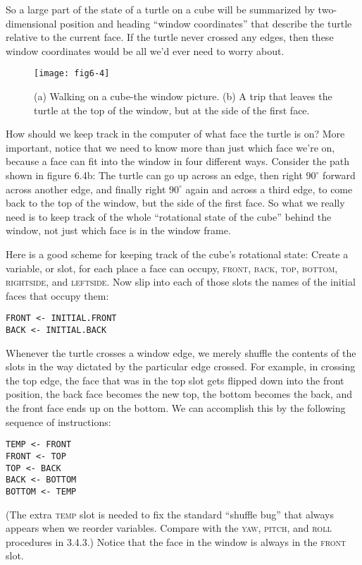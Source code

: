 \documentclass{book}
\begin{document}
So a large part of the state of a turtle on a cube will be summarized
by two-dimensional position and heading ``window coordinates'' that
describe the turtle relative to the current face. If the turtle never crossed
any edges, then these window coordinates would be all we'd ever need
to worry about.

\begin{figure}
\begin{center}
\texttt{[image: fig6-4]}
\caption{(a) Walking on a cube-the window picture. (b) A trip that leaves the turtle at the top of the window, but at the side of the first face.}
\end{center}
\end{figure}

How should we keep track in the computer of what face the turtle is
on? More important, notice that we need to know more than just which
face we're on, because a face can fit into the window in four different
ways. Consider the path shown in figure 6.4b: The turtle can go up
across an edge, then right $90^{\circ}$ forward across another edge, and finally
right $90^{\circ}$ again and across a third edge, to come back to the top of the
window, but the side of the first face. So what we really need is to keep
track of the whole ``rotational state of the cube'' behind the window,
not just which face is in the window frame.

Here is a good scheme for keeping track of the cube's rotational state:
Create a variable, or slot, for each place a face can occupy, \textsc{front}, \textsc{back},
\textsc{top}, \textsc{bottom}, \textsc{rightside}, and \textsc{leftside}. Now slip into each of those
slots the names of the initial faces that occupy them:

\begin{verbatim}
FRONT <- INITIAL.FRONT
BACK <- INITIAL.BACK
\end{verbatim}
Whenever the turtle crosses a window edge, we merely shuffle the
contents of the slots in the way dictated by the particular edge crossed.
For example, in crossing the top edge, the face that was in the top
slot gets flipped down into the front position, the back face becomes
the new top, the bottom becomes the back, and the front face ends up
on the bottom. We can accomplish this by the following sequence of
instructions:

\begin{verbatim}
TEMP <- FRONT
FRONT <- TOP
TOP <- BACK
BACK <- BOTTOM
BOTTOM <- TEMP
\end{verbatim}
(The extra \textsc{temp} slot is needed to fix the standard ``shuffle bug'' that
always appears when we reorder variables. Compare with the \textsc{yaw},
\textsc{pitch}, and \textsc{roll} procedures in 3.4.3.) Notice that the face in the window
is always in the \textsc{front} slot.
\end{document}
